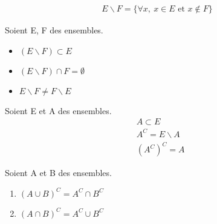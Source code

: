 \begin{graybox}
	\begin{definition}
		\begin{align*}
			E \backslash F = \{\forall x,\ x \in E \text{ et } x \notin F \}	
		\end{align*}
	\end{definition}
\end{graybox}

\begin{remarque}Soient E, F des ensembles.
	\begin{itemize}
		\item $(E \backslash F) \subset E$
		\item $(E \backslash F) \cap F = \emptyset$
		\item $E \backslash F \neq F \backslash E$
	\end{itemize}
\end{remarque}



\begin{remarque}Soient E et A des ensembles.
	\begin{align*}
		&A \subset E \\
		&A^C = E \backslash A \\
		&(A^C)^C = A
	\end{align*}
\end{remarque}

\begin{graybox}
	\begin{proposition} Soient A et B des ensembles.
		\begin{enumerate}
			\item \label{prop10_1} $(A \cup B)^C = A^C \cap B^C$
			\item \label{prop10_2} $(A \cap B)^C = A^C \cup B^C$
		\end{enumerate}
	\end{proposition}
\end{graybox}

